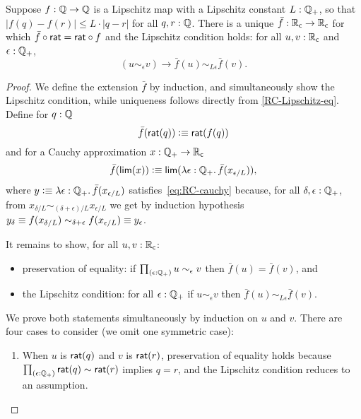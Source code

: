 \begin{lem}\label{RC-extend-Q-Lipschitz}
  Suppose $f : \mathbb{Q} \to \mathbb{Q}$ is a Lipschitz map with a Lipschitz constant $L : \mathbb{Q}_{+}$, so that
  $|f(q) - f(r)| \leq L \cdot |q - r|$ for all $q, r : \mathbb{Q}$. There is a unique $\bar{f} :
  \mathbb{R}_\mathsf{c} \to \mathbb{R}_\mathsf{c}$ for which $\bar{f} \circ \mathsf{rat} = \mathsf{rat} \circ f$ and the Lipschitz
  condition holds: for all $u, v : \mathbb{R}_\mathsf{c}$ and $\epsilon : \mathbb{Q}_{+}$,
  \begin{equation*}
    (u \sim_\epsilon v) \to \bar{f}(u) \sim_{L \epsilon} \bar{f}(v).
  \end{equation*}
\end{lem}

\begin{proof}
  We define the extension $\bar{f}$ by induction, and simultaneously show the Lipschitz
  condition, while uniqueness follows directly from \autoref{RC-Lipschitz-eq}. Define for
  $q : \mathbb{Q}$
  \begin{equation*}
    \bar{f}(\mathsf{rat}(q)) \vcentcolon\equiv \mathsf{rat}(f(q))
  \end{equation*}
  and for a Cauchy approximation $x : \mathbb{Q}_{+} \to \mathbb{R}_\mathsf{c}$
  \begin{equation*}
    \bar{f}(\rclim(x)) \defeq \rclim(\lam{\epsilon : \Qp} \bar{f}(x_{\epsilon/L})),
  \end{equation*}
  where $y \defeq \lam{\epsilon : \Qp} \bar{f}(x_{\epsilon/L})$
  satisfies~\eqref{eq:RC-cauchy} because, for all $\delta, \epsilon : \mathbb{Q}_{+}$, from
  $x_{\delta/L} \sim_{(\delta + \epsilon)/L} x_{\epsilon/L}$ we get by induction
  hypothesis $y_\delta \equiv f(x_{\delta/L}) \sim_{\delta + \epsilon} f(x_{\epsilon/L})
  \equiv y_\epsilon$.

  It remains to show, for all $u, v : \mathbb{R}_\mathsf{c}$:
  \begin{itemize}
  \item preservation of equality: if $\prd{\epsilon : \Qp} u \sim_\epsilon v$ then
    $\bar{f}(u) = \bar{f}(v)$, and
  \item the Lipschitz condition: for all $\epsilon : \mathbb{Q}_{+}$ if $u \sim_\epsilon v$ then
    $\bar{f}(u) \sim_{L \epsilon} \bar{f}(v)$.
  \end{itemize}
  We prove both statements simultaneously by induction on $u$ and $v$. There are four
  cases to consider (we omit one symmetric case):
  \begin{enumerate}

  \item When $u$ is $\mathsf{rat}(q)$ and $v$ is $\mathsf{rat}(r)$, preservation of equality holds because
    $\prd{\epsilon : \Qp} \rcrat(q) \sim \rcrat(r)$ implies $q = r$, and the Lipschitz condition
    reduces to an assumption.


\end{enumerate}
\end{proof}
